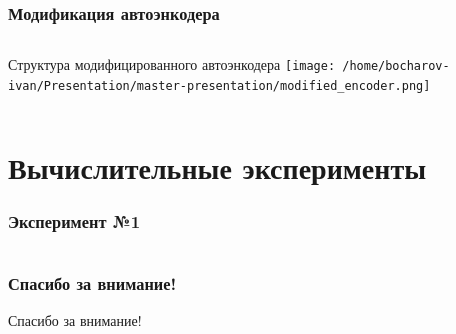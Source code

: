 \documentclass{beamer}
\begin{document}
\begin{frame}
\frametitle{Модификация автоэнкодера}
\begin{columns}[T]
    \begin{column}{.5\textwidth}
    \begin{block}{Структура модифицированного автоэнкодера}
    \texttt{[image: /home/bocharov-ivan/Presentation/master-presentation/modified\_encoder.png]}
    \end{block}
    \end{column}
  \end{columns}
\end{frame}

\section{Вычислительные эксперименты}
\begin{frame}
\frametitle{Эксперимент №1}
\end{frame}

\section{}
\begin{frame}
\frametitle{Спасибо за внимание!}
	Спасибо за внимание!
\end{frame}
\end{document}
